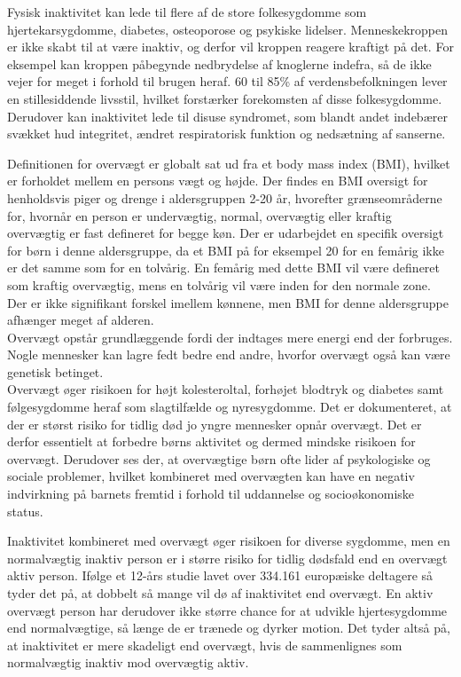 Fysisk inaktivitet kan lede til flere af de store folkesygdomme som hjertekarsygdomme, diabetes, osteoporose og psykiske lidelser. Menneskekroppen er ikke skabt til at være inaktiv, og derfor vil kroppen reagere kraftigt på det. For eksempel kan kroppen påbegynde nedbrydelse af knoglerne indefra, så de ikke vejer for meget i forhold til brugen heraf. 60 til 85\% af verdensbefolkningen lever en stillesiddende livsstil, hvilket forstærker forekomsten af disse folkesygdomme.\citep{Kiens2007,Reshma2002,Martini2012} Derudover kan inaktivitet lede til disuse syndromet, som blandt andet indebærer svækket hud integritet, ændret respiratorisk funktion og nedsætning af sanserne\citep{Knight2012,Mosby2009}.

Definitionen for overvægt er globalt sat ud fra et body mass index (BMI), hvilket er forholdet mellem en persons vægt og højde\citep{Academic2016}. Der findes en BMI oversigt for henholdsvis piger og drenge i aldersgruppen 2-20 år, hvorefter grænseområderne for, hvornår en person er undervægtig, normal, overvægtig eller kraftig overvægtig er fast defineret for begge køn. Der er udarbejdet en specifik oversigt for børn i denne aldersgruppe, da et BMI på for eksempel 20 for en femårig ikke er det samme som for en tolvårig. En femårig med dette BMI vil være defineret som kraftig overvægtig, mens en tolvårig vil være inden for den normale zone. Der er ikke signifikant forskel imellem kønnene, men BMI for denne aldersgruppe afhænger meget af alderen. \citep{DiseaseControl2015}\\
Overvægt opstår grundlæggende fordi der indtages mere energi end der forbruges. Nogle mennesker kan lagre fedt bedre end andre, hvorfor overvægt også kan være genetisk betinget.\citep{Nestle2014}\\
Overvægt øger risikoen for højt kolesteroltal, forhøjet blodtryk og diabetes samt følgesygdomme heraf som slagtilfælde og nyresygdomme. Det er dokumenteret, at der er størst risiko for tidlig død jo yngre mennesker opnår overvægt. Det er derfor essentielt at forbedre børns aktivitet og dermed mindske risikoen for overvægt.\citep{Nestle2014} Derudover ses der, at overvægtige børn ofte lider af psykologiske og sociale problemer, hvilket kombineret med overvægten kan have en negativ indvirkning på barnets fremtid i forhold til uddannelse og socioøkonomiske status\citep{Academic2016}.

Inaktivitet kombineret med overvægt øger risikoen for diverse sygdomme, men en normalvægtig inaktiv person er i større risiko for tidlig dødsfald end en overvægt aktiv person. Ifølge et 12-års studie lavet over 334.161 europæiske deltagere så tyder det på, at dobbelt så mange vil dø af inaktivitet end overvægt.\citep{Ekelund2015} En aktiv overvægt person har derudover ikke større chance for at udvikle hjertesygdomme end normalvægtige, så længe de er trænede og dyrker motion\citep{Nichols2014}. Det tyder altså på, at inaktivitet er mere skadeligt end overvægt, hvis de sammenlignes som normalvægtig inaktiv mod overvægtig aktiv.

